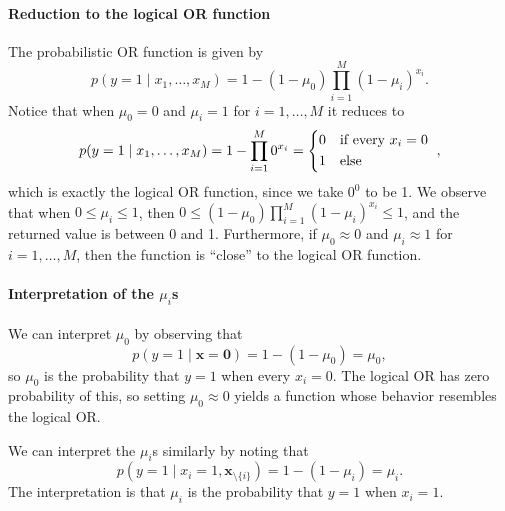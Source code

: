 \documentclass[12pt, a4paper]{article}
\newcommand{\vect}[1]{\bm{#1}}
\begin{document}
\paragraph{Reduction to the logical OR function}
The probabilistic OR function is given by
\begin{equation*}
	p(y=1 \mid x_1, \ldots, x_M) = 1 - (1 - \mu_0) \prod_{i=1}^{M} \left(1 - \mu_i\right)^{x_i}.
\end{equation*}
Notice that when $\mu_0 = 0$ and $\mu_i = 1$ for $i=1, \ldots, M$ it reduces to
\begin{equation*}
p(y=1 \mid x_1, \ldots, x_M) = 1 -  \prod_{i=1}^{M} 0^{x_i}
= \begin{dcases*}
0 & if every $x_i = 0$ \\
1 & else
\end{dcases*},
\end{equation*}
which is exactly the logical OR function, since we take $0^0$ to be 1.
We observe that when $0 \leq \mu_i \leq 1$, then $0 \leq (1 - \mu_0) \prod_{i=1}^{M} \left(1 - \mu_i\right)^{x_i} \leq 1$, and the returned value is between 0 and 1.
Furthermore, if $\mu_0 \approx 0$ and $\mu_i \approx 1$ for $i=1, \ldots, M$, then the function is ``close'' to the logical OR function.

\paragraph{Interpretation of the $\mu_i$s}
We can interpret $\mu_0$ by observing that
\begin{equation*}
	p(y=1 \mid \vect{x} = \vect{0})
	=
	1 - (1 - \mu_0) = \mu_0,
\end{equation*}
so $\mu_0$ is the probability that $y=1$ when every $x_i = 0$.
The logical OR has zero probability of this, so setting $\mu_0 \approx 0$ yields a function whose behavior resembles the logical OR.

We can interpret the $\mu_i$s similarly by noting that
\begin{equation*}
p(y=1 \mid x_i = 1, \vect{x}_{\setminus \{i\}})
=
1 - (1 - \mu_i) = \mu_i.
\end{equation*}
The interpretation is that $\mu_i$ is the probability that $y=1$ when $x_i = 1$.
\end{document}
